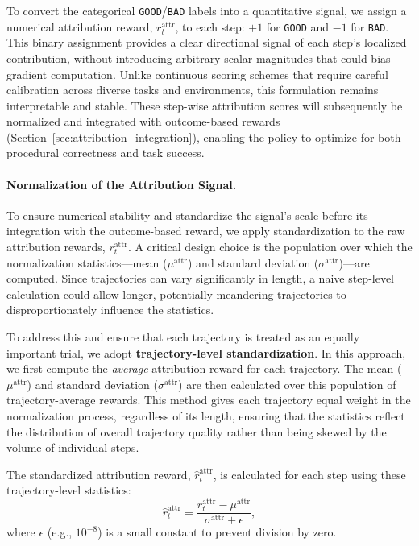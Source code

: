 To convert the categorical \texttt{GOOD}/\texttt{BAD} labels into a quantitative signal, we assign a numerical attribution reward, $r_t^{\text{attr}}$, to each step: $+1$ for \texttt{GOOD} and $-1$ for \texttt{BAD}. This binary assignment provides a clear directional signal of each step's localized contribution, without introducing arbitrary scalar magnitudes that could bias gradient computation. Unlike continuous scoring schemes that require careful calibration across diverse tasks and environments, this formulation remains interpretable and stable. These step-wise attribution scores will subsequently be normalized and integrated with outcome-based rewards (Section~\ref{sec:attribution_integration}), enabling the policy to optimize for both procedural correctness and task success.
 

\paragraph{Normalization of the Attribution Signal.} 
To ensure numerical stability and standardize the signal's scale before its integration with the outcome-based reward, we apply standardization to the raw attribution rewards, $r^{\text{attr}}_t$. A critical design choice is the population over which the normalization statistics---mean ($\mu^{\text{attr}}$) and standard deviation ($\sigma^{\text{attr}}$)---are computed. Since trajectories can vary significantly in length, a naive step-level calculation could allow longer, potentially meandering trajectories to disproportionately influence the statistics.

To address this and ensure that each trajectory is treated as an equally important trial, we adopt \textbf{trajectory-level standardization}. In this approach, we first compute the \emph{average} attribution reward for each trajectory. The mean ($\mu^{\text{attr}}$) and standard deviation ($\sigma^{\text{attr}}$) are then calculated over this population of trajectory-average rewards. This method gives each trajectory equal weight in the normalization process, regardless of its length, ensuring that the statistics reflect the distribution of overall trajectory quality rather than being skewed by the volume of individual steps.

The standardized attribution reward, $\hat{r}^{\text{attr}}_t$, is calculated for each step using these trajectory-level statistics:
\begin{equation}
    \hat{r}^{\text{attr}}_t = \frac{r^{\text{attr}}_t - \mu^{\text{attr}}}{\sigma^{\text{attr}} + \epsilon},
\end{equation}
where $\epsilon$ (e.g., $10^{-8}$) is a small constant to prevent division by zero.

